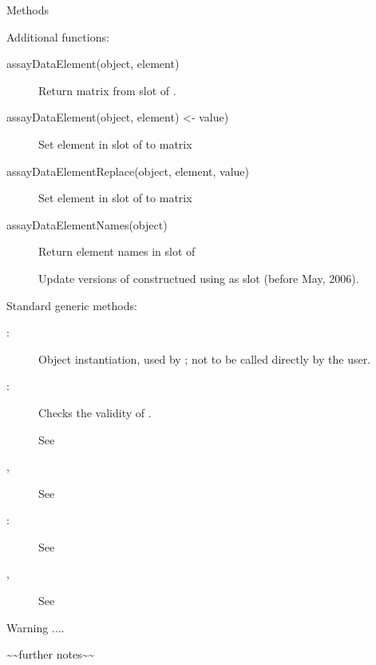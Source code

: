 \documentclass[letterpaper]{book}
\begin{document}
\begin{Section}{Methods}
\begin{description}
\end{description}

Additional functions:
\begin{description}

\item[assayDataElement(object, element)] Return matrix
 from  slot of .
\item[assayDataElement(object, element) <- value)] Set element
 in  slot of  to matrix 
\item[assayDataElementReplace(object, element, value)] Set element
 in  slot of  to matrix 
\item[assayDataElementNames(object)] Return element names in
 slot of 
\item[] Update versions of 
constructued using  as  slot
(before May, 2006).

\end{description}


Standard generic methods:
\begin{description}

\item[:] Object instantiation, used
by ; not to be called directly by the user.
\item[:] Checks the validity of
.
\item[] See 
\item[, ] See 
\item[\code{AlleleSetIllumina[(index)}:] See 
\item[, ] See 

\end{description}

\end{Section}
%
\begin{Section}{Warning }
....
\end{Section}
%
\begin{Note}\relax
 \textasciitilde{}\textasciitilde{}further notes\textasciitilde{}\textasciitilde{} 
\end{Note}
\end{document}
